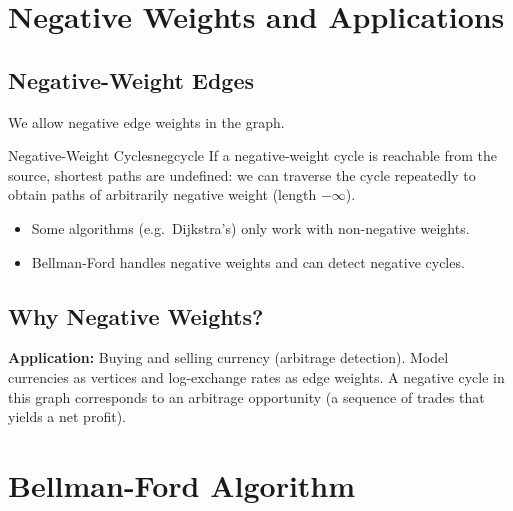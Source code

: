 \section*{Negative Weights and Applications}

\subsection{Negative-Weight Edges}

We allow negative edge weights in the graph.

\begin{remark}{Negative-Weight Cycles}{negcycle}
If a negative-weight cycle is reachable from the source, shortest paths are undefined: we can
traverse the cycle repeatedly to obtain paths of arbitrarily negative weight (length $-\infty$).

\begin{itemize}[noitemsep]
  \item Some algorithms (e.g.\ Dijkstra's) only work with non-negative weights.
  \item Bellman-Ford handles negative weights and can detect negative cycles.
\end{itemize}
\end{remark}

\subsection{Why Negative Weights?}

\textbf{Application:} Buying and selling currency (arbitrage detection).
Model currencies as vertices and log-exchange rates as edge weights.
A negative cycle in this graph corresponds to an arbitrage opportunity
(a sequence of trades that yields a net profit).

\section*{Bellman-Ford Algorithm}

